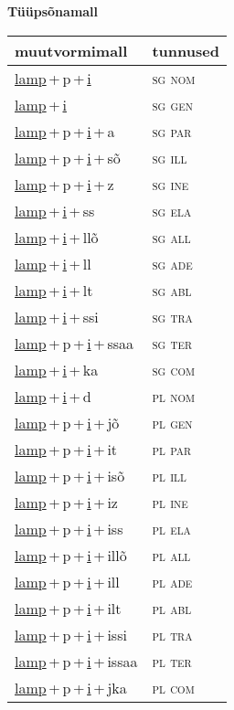 
\vspace{1.8em}
\begin{minipage}{\textwidth}
\textbf{Tüüpsõnamall \,}\\

\begin{sideways}
\begin{tabular}{l l}
muutvormimall & tunnused \\
\hline
\underline{lamp}\,+\,p\,+\,\underline{i} & \textsc{ sg nom } \\
\underline{lamp}\,+\,\underline{i} & \textsc{ sg gen } \\
\underline{lamp}\,+\,p\,+\,\underline{i}\,+\,a & \textsc{ sg par } \\
\underline{lamp}\,+\,p\,+\,\underline{i}\,+\,sõ & \textsc{ sg ill } \\
\underline{lamp}\,+\,p\,+\,\underline{i}\,+\,z & \textsc{ sg ine } \\
\underline{lamp}\,+\,\underline{i}\,+\,ss & \textsc{ sg ela } \\
\underline{lamp}\,+\,\underline{i}\,+\,llõ & \textsc{ sg all } \\
\underline{lamp}\,+\,\underline{i}\,+\,ll & \textsc{ sg ade } \\
\underline{lamp}\,+\,\underline{i}\,+\,lt & \textsc{ sg abl } \\
\underline{lamp}\,+\,\underline{i}\,+\,ssi & \textsc{ sg tra } \\
\underline{lamp}\,+\,p\,+\,\underline{i}\,+\,ssaa & \textsc{ sg ter } \\
\underline{lamp}\,+\,\underline{i}\,+\,ka & \textsc{ sg com } \\
\underline{lamp}\,+\,\underline{i}\,+\,d & \textsc{ pl nom } \\
\underline{lamp}\,+\,p\,+\,\underline{i}\,+\,jõ & \textsc{ pl gen } \\
\underline{lamp}\,+\,p\,+\,\underline{i}\,+\,it & \textsc{ pl par } \\
\underline{lamp}\,+\,p\,+\,\underline{i}\,+\,isõ & \textsc{ pl ill } \\
\underline{lamp}\,+\,p\,+\,\underline{i}\,+\,iz & \textsc{ pl ine } \\
\underline{lamp}\,+\,p\,+\,\underline{i}\,+\,iss & \textsc{ pl ela } \\
\underline{lamp}\,+\,p\,+\,\underline{i}\,+\,illõ & \textsc{ pl all } \\
\underline{lamp}\,+\,p\,+\,\underline{i}\,+\,ill & \textsc{ pl ade } \\
\underline{lamp}\,+\,p\,+\,\underline{i}\,+\,ilt & \textsc{ pl abl } \\
\underline{lamp}\,+\,p\,+\,\underline{i}\,+\,issi & \textsc{ pl tra } \\
\underline{lamp}\,+\,p\,+\,\underline{i}\,+\,issaa & \textsc{ pl ter } \\
\underline{lamp}\,+\,p\,+\,\underline{i}\,+\,jka & \textsc{ pl com } \\
\end{tabular}
\end{sideways}
\label{tab:tüüpsõnamall-lamppi}


\end{minipage}
